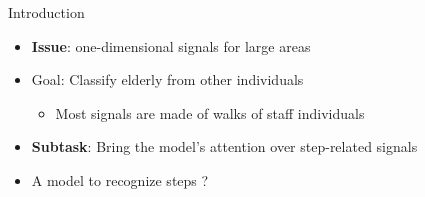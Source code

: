 \documentclass[9pt,t,aspectratio=1610]{beamer}
\begin{document}
\begin{frame}{Introduction}{}
\begin{itemize}
    \item \textbf{Issue}: one-dimensional signals for large areas
    \item Goal: Classify elderly from other individuals
    \begin{itemize}
        \item Most signals are made of walks of staff individuals
    \end{itemize}
    \item \textbf{Subtask}: Bring the model's attention over step-related signals
\end{itemize}
\begin{itemize}
    \item A model to recognize steps ?
\end{itemize}


\end{frame}
\end{document}

